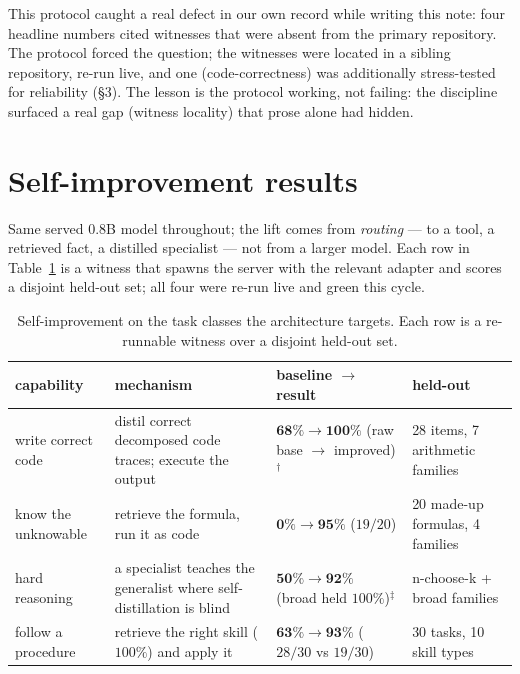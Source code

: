 \documentclass[11pt]{article}
\begin{document}
This protocol caught a real defect in our own record while writing this note: four
headline numbers cited witnesses that were absent from the primary repository. The
protocol forced the question; the witnesses were located in a sibling repository,
re-run live, and one (code-correctness) was additionally stress-tested for
reliability (\S3). The lesson is the protocol working, not failing: the discipline
surfaced a real gap (witness locality) that prose alone had hidden.

\section{Self-improvement results}
Same served 0.8B model throughout; the lift comes from \emph{routing} --- to a tool,
a retrieved fact, a distilled specialist --- not from a larger model. Each row in
Table~\ref{tab:results} is a witness that spawns the server with the relevant adapter
and scores a disjoint held-out set; all four were re-run live and green this cycle.

\begin{table}[h]
\centering
\begin{tabular}{p{2.6cm}p{4.1cm}p{3.0cm}p{2.6cm}}
\toprule
capability & mechanism & baseline $\to$ result & held-out \\
\midrule
write correct code &
distil correct decomposed code traces; execute the output &
$\mathbf{68\%\!\to\!100\%}$ (raw base $\to$ improved)$^\dagger$ &
28 items, 7 arithmetic families \\
\addlinespace
know the unknowable &
retrieve the formula, run it as code &
$\mathbf{0\%\!\to\!95\%}$ ($19/20$) &
20 made-up formulas, 4 families \\
\addlinespace
hard reasoning &
a specialist teaches the generalist where self-distillation is blind &
$\mathbf{50\%\!\to\!92\%}$ (broad held $100\%$)$^\ddagger$ &
n-choose-k + broad families \\
\addlinespace
follow a procedure &
retrieve the right skill ($100\%$) and apply it &
$\mathbf{63\%\!\to\!93\%}$ ($28/30$ vs $19/30$) &
30 tasks, 10 skill types \\
\bottomrule
\end{tabular}
\caption{Self-improvement on the task classes the architecture targets. Each row is a
re-runnable witness over a disjoint held-out set.}
\label{tab:results}
\end{table}
\end{document}
